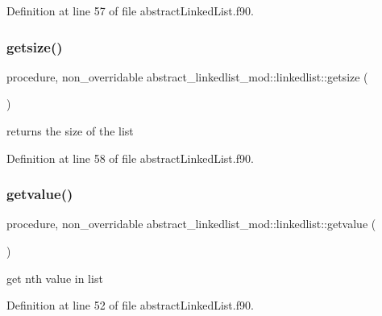 Definition at line 57 of file abstract\+Linked\+List.\+f90.

\mbox{\label{structabstract__linkedlist__mod_1_1linkedlist_a18806ecb0fb5dea1e754de35d3700ab7}} 
\subsubsection{\texorpdfstring{getsize()}{getsize()}}
{\footnotesize\ttfamily procedure, non\+\_\+overridable abstract\+\_\+linkedlist\+\_\+mod\+::linkedlist\+::getsize (\begin{DoxyParamCaption}{ }\end{DoxyParamCaption})\hspace{0.3cm}{\ttfamily [private]}}



returns the size of the list 



Definition at line 58 of file abstract\+Linked\+List.\+f90.

\mbox{\label{structabstract__linkedlist__mod_1_1linkedlist_a5c7d60d9f9213b87eed9ce5350a72460}} 
\subsubsection{\texorpdfstring{getvalue()}{getvalue()}}
{\footnotesize\ttfamily procedure, non\+\_\+overridable abstract\+\_\+linkedlist\+\_\+mod\+::linkedlist\+::getvalue (\begin{DoxyParamCaption}{ }\end{DoxyParamCaption})\hspace{0.3cm}{\ttfamily [private]}}



get nth value in list 



Definition at line 52 of file abstract\+Linked\+List.\+f90.

